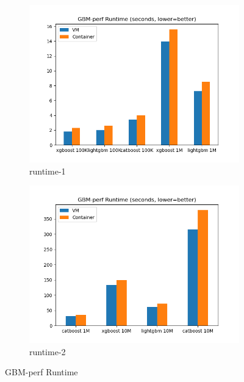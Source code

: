 \documentclass[11pt]{article}
\begin{document}
\begin{figure}[hbt!]
  \centering
  \begin{subfigure}{.5\textwidth}
    \centering
    \includegraphics[width=1.1\linewidth]{gbmperf_runtime_1.png}
    \caption{runtime-1}
    \label{fig:gbmperfr1}
  \end{subfigure}%
  \begin{subfigure}{.5\textwidth}
    \centering
    \includegraphics[width=1.1\linewidth]{gbmperf_runtime_2.png}
    \caption{runtime-2}
    \label{fig:gbmperfr2}
  \end{subfigure}
  \caption{GBM-perf Runtime}
  \label{fig:rubis}
\end{figure}
\end{document}
